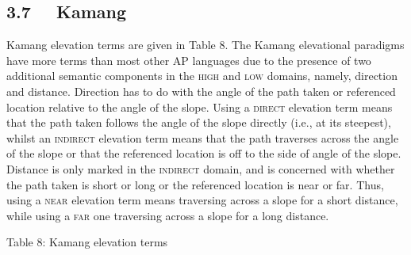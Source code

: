 \subsection[3.7 \ \ Kamang]{3.7 \ \ Kamang}
Kamang elevation terms are given in Table 8. The Kamang elevational paradigms have more terms than most other AP languages due to the presence of two additional semantic components in the \textsc{high} and \textsc{low }domains, namely, direction and distance. Direction has to do with the angle of the path taken or referenced location relative to the angle of the slope. Using a \textsc{direct }elevation term means that the path taken follows the angle of the slope directly (i.e., at its steepest), whilst an \textsc{indirect }elevation term means that the path traverses across the angle of the slope or that the referenced location is off to the side of angle of the slope. Distance is only marked in the \textsc{indirect} domain, and is concerned with whether the path taken is short or long or the referenced location is near or far. Thus, using a \textsc{near} elevation term means traversing across a slope for a short distance, while using a \textsc{far} one traversing across a slope for a long distance.

{\centering
Table 8: Kamang elevation terms
\par}

